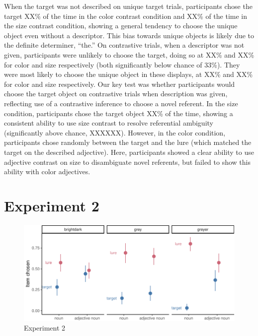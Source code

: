 \documentclass[10pt, letterpaper]{article}
\newenvironment{CodeChunk}{}{}
\begin{document}
When the target was not described on unique target trials, participants
chose the target XX\% of the time in the color contrast condition and
XX\% of the time in the size contrast condition, showing a general
tendency to choose the unique object even without a descriptor. This
bias towards unique objects is likely due to the definite determiner,
``the.'' On contrastive trials, when a descriptor was not given,
participants were unlikely to choose the target, doing so at XX\% and
XX\% for color and size respectively (both significantly below chance of
33\%). They were most likely to choose the unique object in these
displays, at XX\% and XX\% for color and size respectively. Our key test
was whether participants would choose the target object on contrastive
trials when description was given, reflecting use of a contrastive
inference to choose a novel referent. In the size condition,
participants chose the target object XX\% of the time, showing a
consistent ability to use size contrast to resolve referential ambiguity
(significantly above chance, XXXXXX). However, in the color condition,
participants chose randomly between the target and the lure (which
matched the target on the described adjective). Here, participants
showed a clear ability to use adjective contrast on size to disambiguate
novel referents, but failed to show this ability with color adjectives.

\hypertarget{experiment-2}{%
\section{Experiment 2}\label{experiment-2}}

\begin{CodeChunk}
\begin{figure}[tb]

{\centering \includegraphics{figs/e2_fig-1} 

}

\caption[Experiment 2]{Experiment 2}\label{fig:e2_fig}
\end{figure}
\end{CodeChunk}
\end{document}

